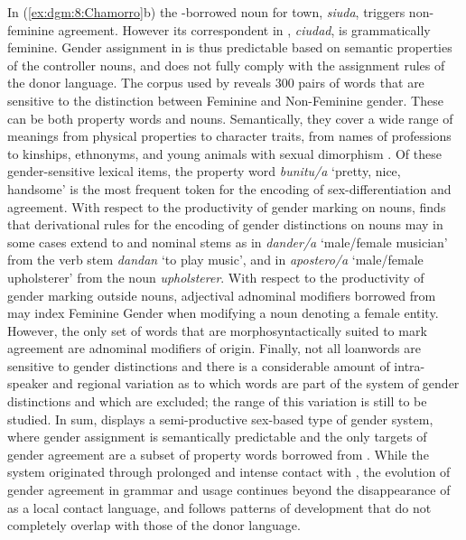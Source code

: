 \documentclass[output=collectionpaper]{langsci/langscibook}
\begin{document}
In (\ref{ex:dgm:8:Chamorro}b) the -borrowed noun for town, \textit{siuda}, triggers non-feminine agreement. However its correspondent in , \textit{ciudad}, is grammatically feminine. Gender assignment in  is thus predictable based on semantic properties of the controller nouns, and does not fully comply with the assignment rules of the donor language. The  corpus used by \citet{Stolz2012} reveals 300 pairs of words that are sensitive to the distinction between Feminine and Non-Feminine gender. These can be both property words and nouns. Semantically, they cover a wide range of meanings from physical properties to character traits, from names of professions to  kinships, ethnonyms, and young animals with sexual dimorphism \citep[][117]{Stolz2012}. Of these gender-sensitive lexical items, the property word \textit{bunitu/a} `pretty, nice, handsome' is the most frequent token for the encoding of sex-differentiation and agreement. With respect to the productivity of gender marking on nouns, \citet{Stolz2012} finds that  derivational rules for the encoding of gender distinctions on nouns may in some cases extend to  and  nominal stems as in \textit{dander/a} `male/female musician' from the  verb stem \textit{dandan} `to play music', and in \textit{apostero/a} `male/female upholsterer' from the  noun \textit{upholsterer}. With respect to the productivity of gender marking outside nouns, adjectival adnominal modifiers borrowed from  may index Feminine Gender when modifying a  noun denoting a female entity. However, the only set of words that are morphosyntactically suited to mark agreement are adnominal modifiers of  origin. Finally, not all  loanwords are sensitive to gender distinctions and there is a considerable amount of intra-speaker and regional variation as to which words are part of the system of gender distinctions and which are excluded; the range of this variation is still to be studied. In sum,  displays a semi-productive sex-based type of gender system, where gender assignment is semantically predictable and the only targets of gender agreement are a subset of property words borrowed from .
While the system originated through prolonged and intense contact with , the evolution of gender agreement in  grammar and usage continues beyond the disappearance of  as a local contact language, and follows patterns of development that do not completely overlap with those of the donor language.
\end{document}
